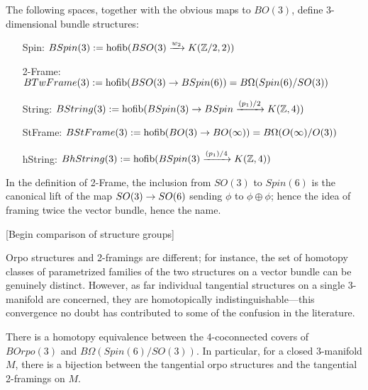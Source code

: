 \documentclass{amsart}
\begin{document}
\begin{definition}
The following spaces, together with the obvious maps to $BO(3)$, define 3-dimensional bundle structures:
\begin{itemize}
\item[Spin:] $BSpin(3) := \operatorname{hofib}(BSO(3) \xrightarrow{w_2} K(\mathbb Z/2,2))$
\item[2-Frame:] $BTwFrame(3) := \operatorname{hofib}(BSO(3) \rightarrow BSpin(6)) = B\Omega(Spin(6)/SO(3))$
\item[String:] $BString(3) := \operatorname{hofib}(BSpin(3) \rightarrow BSpin \xrightarrow{(p_1)/2} K(\mathbb Z,4))$
\item[StFrame:] $BStFrame(3) := \operatorname{hofib}(BO(3) \rightarrow BO(\infty)) = B\Omega(O(\infty)/O(3))$
\item[hString:] $BhString(3) := \operatorname{hofib}(BSpin(3) \xrightarrow{(p_1)/4} K(\mathbb Z,4))$
\end{itemize}
\end{definition}

\nid In the definition of 2-Frame, the inclusion from $SO(3)$ to $Spin(6)$ is the canonical lift of the map $SO(3) \rightarrow SO(6)$ sending $\phi$ to $\phi \oplus \phi$; hence the idea of framing twice the vector bundle, hence the name.

[Begin comparison of structure groups]

Orpo structures and 2-framings are different; for instance, the set of homotopy classes of parametrized families of the two structures on a vector bundle can be genuinely distinct.  However, as far individual tangential structures on a single 3-manifold are concerned, they are homotopically indistinguishable---this convergence no doubt has contributed to some of the confusion in the literature.
\begin{proposition}
There is a homotopy equivalence between the 4-coconnected covers of $BOrpo(3)$ and $B\Omega(Spin(6)/SO(3))$.  In particular, for a closed 3-manifold $M$, there is a bijection between the tangential orpo structures and the tangential 2-framings on $M$.
\end{proposition}
\end{document}
